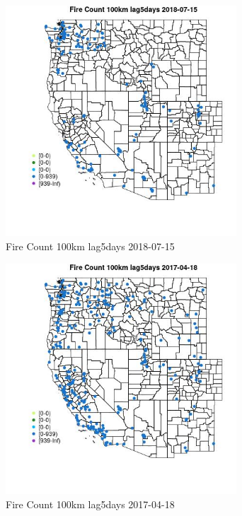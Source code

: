 \begin{figure} 
\centering  
\includegraphics[width=0.77\textwidth]{Code_Outputs/Report_ML_input_PM25_Step4_part_e_de_duplicated_aves_compiled_2019-05-20wNAs_MapObsFire_Count_100km_lag5days2018-07-15.jpg} 
\caption{\label{fig:Report_ML_input_PM25_Step4_part_e_de_duplicated_aves_compiled_2019-05-20wNAsMapObsFire_Count_100km_lag5days2018-07-15}Fire Count 100km lag5days 2018-07-15} 
\end{figure} 
 

\begin{figure} 
\centering  
\includegraphics[width=0.77\textwidth]{Code_Outputs/Report_ML_input_PM25_Step4_part_e_de_duplicated_aves_compiled_2019-05-20wNAs_MapObsFire_Count_100km_lag5days2017-04-18.jpg} 
\caption{\label{fig:Report_ML_input_PM25_Step4_part_e_de_duplicated_aves_compiled_2019-05-20wNAsMapObsFire_Count_100km_lag5days2017-04-18}Fire Count 100km lag5days 2017-04-18} 
\end{figure} 
 

